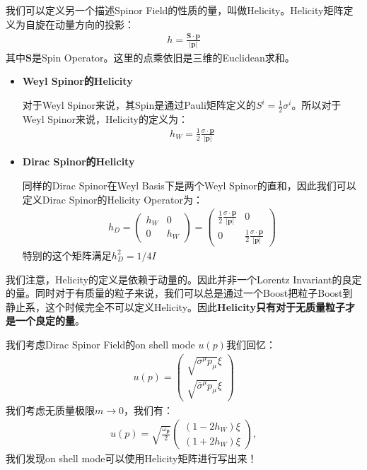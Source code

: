 我们可以定义另一个描述Spinor Field的性质的量，叫做Helicity。Helicity矩阵定义为自旋在动量方向的投影：
\begin{align}
  h = \frac{\mathbf{S}\cdot \mathbf{p}}{|\mathbf{p}|}
\end{align}
其中$ \mathbf{S} $是Spin Operator。这里的点乘依旧是三维的Euclidean求和。
\begin{itemize}
  \item \textbf{Weyl Spinor的Helicity}

    对于Weyl Spinor来说，其Spin是通过Pauli矩阵定义的$ S^i = \frac{1}{2} \sigma^i
    $。所以对于Weyl Spinor来说，Helicity的定义为：
    \begin{align}
      h_W = \frac{1}{2}\frac{\sigma\cdot \mathbf{p}}{|\mathbf{p}|}
    \end{align}
  \item \textbf{Dirac Spinor的Helicity}

    同样的Dirac Spinor在Weyl Basis下是两个Weyl Spinor的直和，因此我们可以定义Dirac
    Spinor的Helicity Operator为：
    \begin{align}
      h_D =
      \begin{pmatrix} h_W & 0 \\ 0 & h_W
      \end{pmatrix}
      =
      \begin{pmatrix} \frac{1}{2}\frac{\sigma\cdot
        \mathbf{p}}{|\mathbf{p}|} & 0 \\ 0 &
        \frac{1}{2}\frac{\sigma\cdot \mathbf{p}}{|\mathbf{p}|}
      \end{pmatrix}
    \end{align}
    特别的这个矩阵满足$ h_D^2 = 1/4 I $
\end{itemize}
我们注意，Helicity的定义是依赖于动量的。因此并非一个Lorentz
Invariant的良定的量。同时对于有质量的粒子来说，我们可以总是通过一个Boost把粒子Boost到静止系，这个时候完全不可以定义Helicity。因此\textbf{Helicity只有对于无质量粒子才是一个良定的量}。

\bigskip
{}

我们考虑Dirac Spinor Field的on shell mode $ u(p) $我们回忆：
\begin{align}
  u(p)=
  \begin{pmatrix}\sqrt{\sigma^{\mu}p_{\mu}}\xi\\\sqrt{\bar{\sigma}^{\mu}p_{\mu}}\xi
  \end{pmatrix}
\end{align}
我们考虑无质量极限$ m\rightarrow 0 $，我们有：
\begin{align}
  u(p)=\sqrt{\frac{\omega_\mathbf{p}}{2}}
  \begin{pmatrix}(1-2h_W)\xi\\(1+2h_W)\xi
  \end{pmatrix},
\end{align}
我们发现on shell mode可以使用Helicity矩阵进行写出来！

